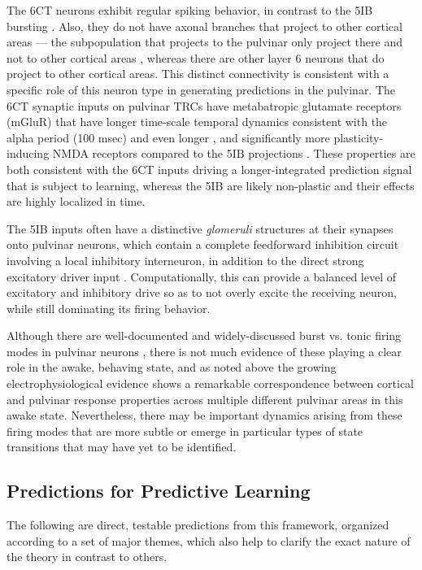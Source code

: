 \documentclass[11pt,twoside]{article}
\newif\myifpdf
\begin{document}
The 6CT neurons exhibit regular spiking behavior, in contrast to the 5IB bursting \cite{Thomson10,ThomsonLamy07}. Also, they do not have axonal branches that project to other cortical areas --- the subpopulation that projects to the pulvinar only project there and not to other cortical areas \cite{PetrofViaeneSherman12}, whereas there are other layer 6 neurons that do project to other cortical areas.  This distinct connectivity is consistent with a specific role of this neuron type in generating predictions in the pulvinar.   The 6CT synaptic inputs on pulvinar TRCs have metabatropic glutamate receptors (mGluR) that have longer time-scale temporal dynamics consistent with the alpha period (100 msec) and even longer \cite{Sherman14}, and significantly more plasticity-inducing NMDA receptors compared to the 5IB projections \cite{UsreySherman18}.  These properties are both consistent with the 6CT inputs driving a longer-integrated prediction signal that is subject to learning, whereas the 5IB are likely non-plastic and their effects are highly localized in time. 

The 5IB inputs often have a distinctive \emph{glomeruli} structures at their synapses onto pulvinar neurons, which contain a complete feedforward inhibition circuit involving a local inhibitory interneuron, in addition to the direct strong excitatory driver input \cite{WilsonBoseShermanEtAl84}.  Computationally, this can provide a balanced level of excitatory and inhibitory drive so as to not overly excite the receiving neuron, while still dominating its firing behavior.

Although there are well-documented and widely-discussed burst vs. tonic firing modes in pulvinar neurons \cite{ShermanGuillery06}, there is not much evidence of these playing a clear role in the awake, behaving state, and as noted above the growing electrophysiological evidence shows a remarkable correspondence between cortical and pulvinar response properties across multiple different pulvinar areas in this awake state.  Nevertheless, there may be important dynamics arising from these firing modes that are more subtle or emerge in particular types of state transitions that may have yet to be identified.

\subsection{Predictions for Predictive Learning}

The following are direct, testable predictions from this framework, organized according to a set of major themes, which also help to clarify the exact nature of the theory in contrast to others.
\end{document}
